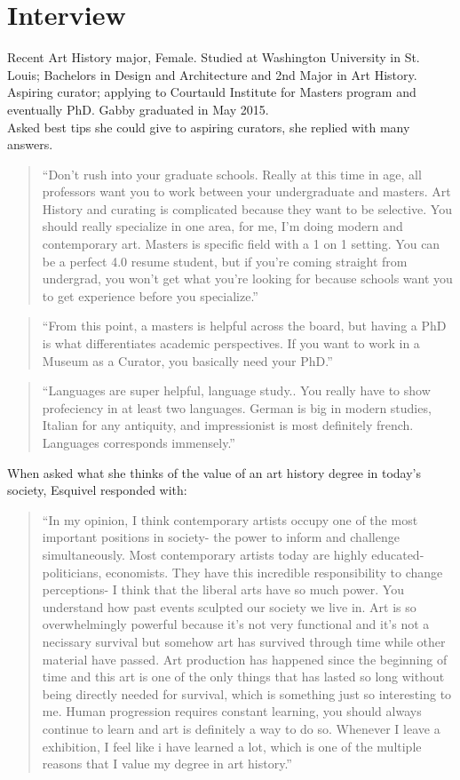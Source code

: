 \section{Interview}
	Recent Art History major, Female. Studied at Washington University in St. Louis; Bachelors in Design and Architecture and 2nd Major in Art History. Aspiring curator; applying to Courtauld Institute for Masters program and eventually PhD. Gabby graduated in May 2015. \\ 
	Asked best tips she could give to aspiring curators, she replied with many answers.
	\begin{quote}
		“Don’t rush into your graduate schools. Really at this time in age, all professors want you to work between your undergraduate and masters. Art History and curating is complicated because they want to be selective. You should really specialize in one area, for me, I’m doing modern and contemporary art. Masters is specific field with a 1 on 1 setting. You can be a perfect 4.0 resume student, but if you’re coming straight from undergrad, you won’t get what you’re looking for because schools want you to get experience before you specialize.”
	\end{quote}
	\begin{quote} 
		“From this point, a masters is helpful across the board, but having a PhD is what differentiates academic perspectives. If you want to work in a Museum as a Curator, you basically need your PhD.”
	\end{quote}
	\begin{quote}
		“Languages are super helpful, language study.. You really have to show profeciency in at least two languages. German is big in modern studies, Italian for any antiquity, and impressionist is most definitely french. Languages corresponds immensely.”
	\end{quote}
	When asked what she thinks of the value of an art history degree in today’s society, Esquivel responded with:
	\begin{quote}
		“In my opinion, I think contemporary artists occupy one of the most important positions in society- the power to inform and challenge simultaneously. Most contemporary artists today are highly educated- politicians, economists. They have this incredible responsibility to change perceptions- I think that the liberal arts have so much power. You understand how past events sculpted our society we live in. Art is so overwhelmingly powerful because it’s not very functional and it’s not a necissary survival but somehow art has survived through time while other material have passed. Art production has happened since the beginning of time and this art is one of the only things that has lasted so long without being directly needed for survival, which is something just so interesting to me. Human progression requires constant learning, you should always continue to learn and art is definitely a way to do so. Whenever I leave a exhibition, I feel like i have learned a lot, which is one of the multiple reasons that I value my degree in art history.”
	\end{quote}

